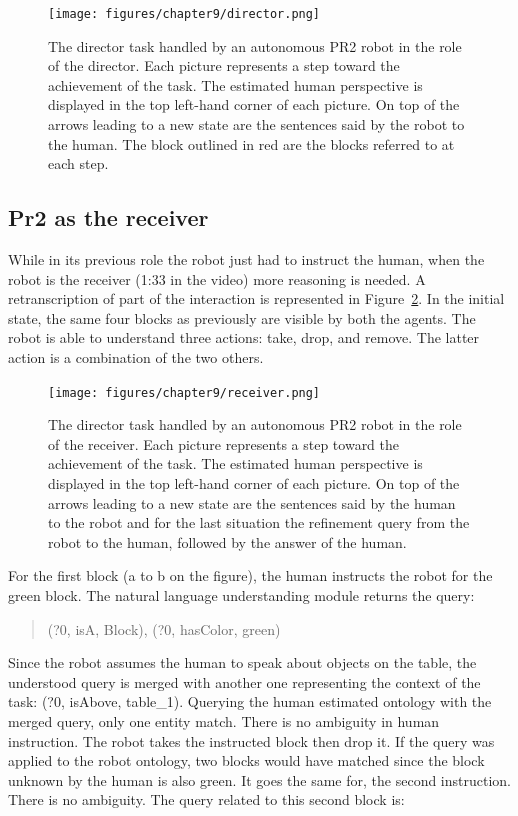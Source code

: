 \begin{figure}[ht!]
\centering
\texttt{[image: figures/chapter9/director.png]}
\caption{\label{fig:chap9_director} The director task handled by an autonomous PR2 robot in the role of the director. Each picture represents a step toward the achievement of the task. The estimated human perspective is displayed in the top left-hand corner of each picture. On top of the arrows leading to a new state are the sentences said by the robot to the human. The block outlined in red are the blocks referred to at each step. }
\end{figure}

\subsection{Pr2 as the receiver}

While in its previous role the robot just had to instruct the human, when the robot is the receiver (1:33 in the video) more reasoning is needed. A retranscription of part of the interaction is represented in Figure~\ref{fig:chap9_receiver}. In the initial state, the same four blocks as previously are visible by both the agents. The robot is able to understand three actions: take, drop, and remove. The latter action is a combination of the two others.

\begin{figure}[ht!]
\centering
\texttt{[image: figures/chapter9/receiver.png]}
\caption{\label{fig:chap9_receiver} The director task handled by an autonomous PR2 robot in the role of the receiver. Each picture represents a step toward the achievement of the task. The estimated human perspective is displayed in the top left-hand corner of each picture. On top of the arrows leading to a new state are the sentences said by the human to the robot and for the last situation the refinement query from the robot to the human, followed by the answer of the human. }
\end{figure}

For the first block (a to b on the figure), the human instructs the robot for the green block. The natural language understanding module returns the \sparql{} query:

\begin{quote} 
\centering 
(?0, isA, Block), (?0, hasColor, green)
\end{quote}

Since the robot assumes the human to speak about objects on the table, the understood query is merged with another one representing the context of the task: (?0, isAbove, table\_1). Querying the human estimated ontology with the merged query, only one entity match. There is no ambiguity in human instruction. The robot takes the instructed block then drop it. If the query was applied to the robot ontology, two blocks would have matched since the block unknown by the human is also green. It goes the same for, the second instruction. There is no ambiguity. The \sparql{} query related to this second block is:

